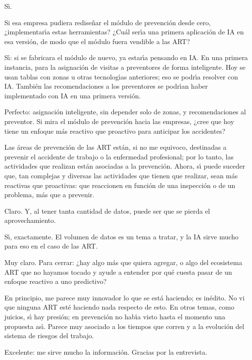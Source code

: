 \begin{description}[style=nextline, leftmargin=0cm, labelsep=0.35cm]
\item[\textbf{Entrevistado:}]
S\'{\i}.

\item[\textbf{Entrevistador:}]
Si esa empresa pudiera redise\~nar el m\'odulo de prevenci\'on desde cero, ¿implementar\'{\i}a estas herramientas?
¿Cu\'al ser\'{\i}a una primera aplicaci\'on de IA en esa versi\'on, de modo que el m\'odulo fuera vendible a las ART?

\item[\textbf{Entrevistado:}]
S\'{\i}: si se fabricara el m\'odulo de nuevo, ya estar\'{\i}a pensando en IA.
En una primera instancia, para la asignaci\'on de visitas a preventores de forma inteligente.
Hoy se usan tablas con zonas u otras tecnolog\'{\i}as anteriores; eso se podr\'{\i}a resolver con IA.
Tambi\'en las recomendaciones a los preventores se podr\'{\i}an haber implementado con IA en una primera versi\'on.

\item[\textbf{Entrevistador:}]
Perfecto: asignaci\'on inteligente, sin depender solo de zonas, y recomendaciones al preventor.
Si mira el m\'odulo de prevenci\'on hacia las empresas, ¿cree que hoy tiene un enfoque m\'as reactivo que proactivo para anticipar los accidentes?

\item[\textbf{Entrevistado:}]
Las \'areas de prevenci\'on de las ART est\'an, si no me equivoco, destinadas a prevenir el accidente de trabajo o la enfermedad profesional; por lo tanto, las actividades que realizan est\'an asociadas a la prevenci\'on.
Ahora, s\'{\i} puede suceder que, tan complejas y diversas las actividades que tienen que realizar, sean m\'as reactivas que proactivas: que reaccionen en funci\'on de una inspecci\'on o de un problema, m\'as que a prevenir.

\item[\textbf{Entrevistador:}]
Claro.
Y, al tener tanta cantidad de datos, puede ser que se pierda el aprovechamiento.

\item[\textbf{Entrevistado:}]
S\'{\i}, exactamente.
El volumen de datos es un tema a tratar, y la IA sirve mucho para eso en el caso de las ART.

\item[\textbf{Entrevistador:}]
Muy claro.
Para cerrar: ¿hay algo m\'as que quiera agregar, o algo del ecosistema ART que no hayamos tocado y ayude a entender por qu\'e cuesta pasar de un enfoque reactivo a uno predictivo?

\item[\textbf{Entrevistado:}]
En principio, me parece muy innovador lo que se est\'a haciendo; es in\'edito.
No vi que ninguna ART est\'e haciendo nada respecto de esto.
En otros temas, como juicios, s\'{\i} hay presi\'on; en prevenci\'on no hab\'{\i}a visto hasta el momento una propuesta as\'{\i}.
Parece muy asociado a los tiempos que corren y a la evoluci\'on del sistema de riesgos del trabajo.

\item[\textbf{Entrevistador:}]
Excelente: me sirve mucho la informaci\'on.
Gracias por la entrevista.

\end{description}
